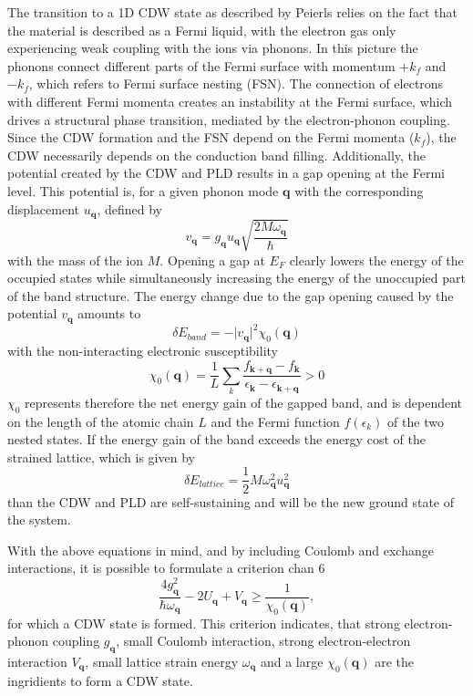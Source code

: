 The transition to a 1D CDW state as described by Peierls relies on the fact that the material is described as a Fermi liquid, with the electron gas only experiencing weak coupling with the ions via phonons.
In this picture the phonons connect different parts of the Fermi surface with momentum $+k_f$ and $-k_f$, which refers to Fermi surface nesting (FSN).
The connection of electrons with different Fermi momenta creates an instability at the Fermi surface, which drives a structural phase transition, mediated by the electron-phonon coupling.
Since the CDW formation and the FSN depend on the Fermi momenta ($k_f$), the CDW necessarily depends on the conduction band filling.
Additionally, the potential created by the CDW and PLD results in a gap opening at the Fermi level.
This potential is, for a given phonon mode $\mathbf{q}$ with the corresponding displacement $u_\mathbf{q}$, defined by
\begin{equation}
	v_\mathbf{q} = g_\mathbf{q} u_\mathbf{q} \sqrt{\frac{2M\omega_\mathbf{q}}{\hbar}}
\end{equation}
with the mass of the ion $M$.
Opening a gap at $E_F$ clearly lowers the energy of the occupied states while simultaneously increasing the energy of the unoccupied part of the band structure.
The energy change due to the gap opening caused by the potential $v_\mathbf{q}$ amounts to
\begin{equation}
	\delta E_{band} = -\lvert v_\mathbf{q}\rvert^2 \chi_0(\mathbf{q})
\end{equation}
with the non-interacting electronic susceptibility
\begin{equation}
	\chi_0(\mathbf{q}) = \frac{1}{L} \sum_{k}^{} \frac{f_{\mathbf{k}+\mathbf{q}}-f_\mathbf{k}}{\epsilon_\mathbf{k}-\epsilon_{\mathbf{k}+\mathbf{q}}}>0
\end{equation}
$\chi_0$ represents therefore the net energy gain of the gapped band, and is dependent on the length of the atomic chain $L$ and the Fermi function $f(\epsilon_k)$ of the two nested states.
If the energy gain of the band exceeds the energy cost of the  strained lattice, which is given by
\begin{equation}
	\delta E_{lattice} = \frac{1}{2} M\omega_\mathbf{q}^2 u_\mathbf{q}^2
\end{equation}
than the CDW and PLD are self-sustaining and will be the new ground state of the system.

With the above equations in mind, and by including Coulomb and exchange interactions, it is possible to formulate a criterion \cite{} chan 6
\begin{equation}
	\frac{4g_\mathbf{q}^2}{\hbar\omega_\mathbf{q}}-2U_\mathbf{q}+V_\mathbf{q}\geq\frac{1}{\chi_0(\mathbf{q})},
\end{equation}
for which a CDW state is formed.
This criterion indicates, that strong electron-phonon coupling $g_\mathbf{q}$, small Coulomb interaction, strong electron-electron interaction $V_\mathbf{q}$, small lattice strain energy $\omega_\mathbf{q}$ and a large $\chi_0(\mathbf{q})$ are the ingridients to form a CDW state. 

